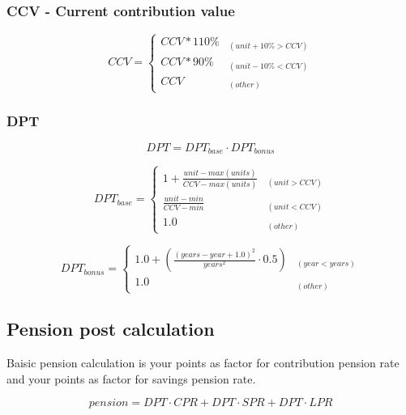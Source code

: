 \subsubsection*{CCV - Current contribution value}

\begin{equation*}
CCV = \begin{cases} 
CCV * 110\% & _{(unit+10\% > CCV)} \\
CCV * 90\% & _{(unit-10\% < CCV)} \\
CCV & _{(other)}
\end{cases}
\end{equation*}

\subsubsection*{DPT}

\begin{equation*}
DPT = DPT_{base} \cdot DPT_{bonus}
\end{equation*}

\begin{equation*}
DPT_{base} = \begin{cases} 
1 + \frac{unit-max(units)} {CCV - max(units)} 
  & _{(unit > CCV)} \\
\frac{unit - min} {CCV - min} 
  & _{(unit < CCV)} \\
1.0 & _{(other)}
\end{cases}
\end{equation*}

\begin{equation*}
DPT_{bonus} = \begin{cases} 
1.0 + (\frac{(years - year + 1.0)^2}
      {years^2} \cdot 0.5) & _{(year < years)} \\
1.0 & _{(other)} 
\end{cases}
\end{equation*}


\newpage

\subsection{Pension post calculation}

Baisic pension calculation is your points
as factor for contribution pension rate and 
your points as factor for savings pension rate.

\begin{equation*}
pension = DPT \cdot CPR + DPT \cdot SPR + DPT \cdot LPR
\end{equation*}

